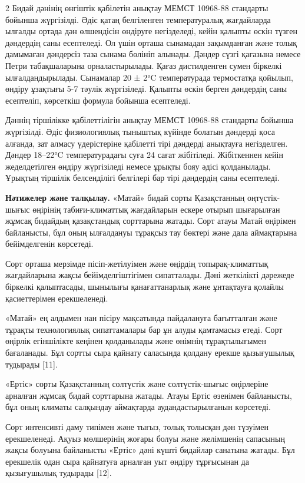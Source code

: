 \begin{multicols}{2}
Бидай дәнінің өнгіштік қабілетін анықтау МЕМСТ 10968-88 стандарты
бойынша жүргізілді. Әдіс қатаң белгіленген температуралық жағдайларда
ылғалды ортада дән өлшендісін өндіруге негізделеді, кейін қалыпты өскін
түзген дәндердің саны есептеледі. Ол үшін орташа сынамадан зақымданған
және толық дамымаған дәндерсіз таза сынама бөлініп алынады. Дәндер сүзгі
қағазына немесе Петри табақшаларына орналастырылады. Қағаз дистилденген
сумен біркелкі ылғалдандырылады. Сынамалар 20 ± 2°C температурада
термостатқа қойылып, өндіру ұзақтығы 5-7 тәулік жүргізіледі. Қалыпты
өскін берген дәндердің саны есептеліп, көрсеткіш формула бойынша
есептеледі.

Дәннің тіршілікке қабілеттілігін анықтау МЕМСТ 10968-88 стандарты
бойынша жүргізілді. Әдіс физиологиялық тыныштық күйінде болатын дәндерді
қоса алғанда, зат алмасу үдерістеріне қабілетті тірі дәндерді анықтауға
негізделген. Дәндер 18--22°C температурадағы суға 24 сағат жібітіледі.
Жібіткеннен кейін жеделдетілген өндіру жүргізіледі немесе ұрықты бояу
әдісі қолданылады. Ұрықтың тіршілік белсенділігі белгілері бар тірі
дәндердің саны есептеледі.

{\bfseries Нәтижелер және талқылау.} «Матай» бидай сорты Қазақстанның
оңтүстік-шығыс өңірінің табиғи-климаттық жағдайларын ескере отырып
шығарылған жұмсақ бидайдың қазақстандық сорттарына жатады. Сорт атауы
Матай өңірімен байланысты, бұл оның ылғалдануы тұрақсыз тау бөктері және
дала аймақтарына бейімделгенін көрсетеді.

Сорт орташа мерзімде пісіп-жетілуімен және өңірдің топырақ-климаттық
жағдайларына жақсы бейімделгіштігімен сипатталады. Дәні жеткілікті
дәрежеде біркелкі қалыптасады, шынылығы қанағаттанарлық және ұнтақтауға
қолайлы қасиеттерімен ерекшеленеді.

«Матай» ең алдымен нан пісіру мақсатында пайдалануға бағытталған және
тұрақты технологиялық сипаттамалары бар ұн алуды қамтамасыз етеді. Сорт
өңірлік егіншілікте кеңінен қолданылады және өнімнің тұрақтылығымен
бағаланады. Бұл сортты сыра қайнату саласында қолдану ерекше қызығушылық
тудырады {[}11{]}.

«Ертіс» сорты Қазақстанның солтүстік және солтүстік-шығыс өңірлеріне
арналған жұмсақ бидай сорттарына жатады. Атауы Ертіс өзенімен
байланысты, бұл оның климаты салқындау аймақтарда аудандастырылғанын
көрсетеді.

Сорт интенсивті даму типімен және тығыз, толық толысқан дән түзуімен
ерекшеленеді. Ақуыз мөлшерінің жоғары болуы және желімшенің сапасының
жақсы болуына байланысты «Ертіс» дәні күшті бидайлар санатына жатады.
Бұл ерекшелік одан сыра қайнатуға арналған уыт өндіру тұрғысынан да
қызығушылық тудырады {[}12{]}.


\end{multicols}
